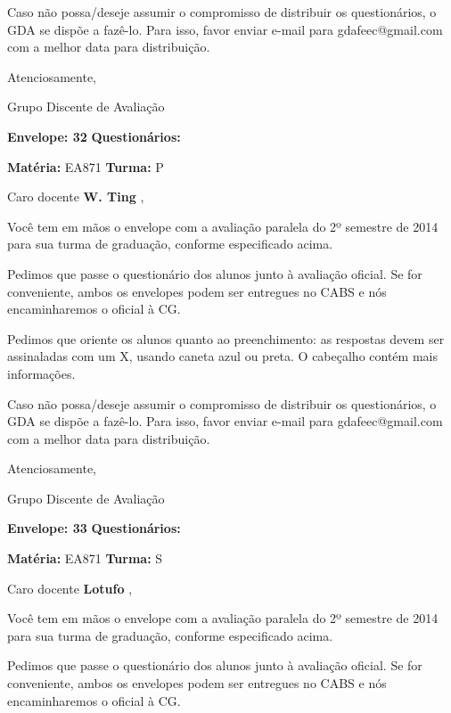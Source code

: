 \documentclass[a5paper]{letter}
\begin{document}
	Caso não possa/deseje assumir o compromisso de distribuir os questionários, o GDA se dispõe a fazê-lo. Para isso, favor enviar e-mail para gdafeec@gmail.com com a melhor data para distribuição.


Atenciosamente, 

Grupo Discente de Avaliação

\vspace{0.5cm}

{\bf Envelope: 32 }		\hfill	{\bf Questionários:} \hspace{2cm}

\newpage
\thispagestyle{empty}

\hfill {\bf Matéria:} EA871 {\bf Turma:} P

Caro docente {\bf W. Ting }, 

	Você tem em mãos o envelope com a avaliação paralela do 2º semestre de 2014 para sua turma de graduação, conforme especificado acima.

	Pedimos que passe o questionário dos alunos junto à avaliação oficial. Se for conveniente, ambos os envelopes podem ser entregues no CABS e nós encaminharemos o oficial à CG.

Pedimos que oriente os alunos quanto ao preenchimento: as respostas devem ser assinaladas com um X, usando caneta azul ou preta. O cabeçalho contém mais informações.

	Caso não possa/deseje assumir o compromisso de distribuir os questionários, o GDA se dispõe a fazê-lo. Para isso, favor enviar e-mail para gdafeec@gmail.com com a melhor data para distribuição.


Atenciosamente, 

Grupo Discente de Avaliação

\vspace{0.5cm}

{\bf Envelope: 33 }		\hfill	{\bf Questionários:} \hspace{2cm}

\newpage
\thispagestyle{empty}

\hfill {\bf Matéria:} EA871 {\bf Turma:} S

Caro docente {\bf Lotufo }, 

	Você tem em mãos o envelope com a avaliação paralela do 2º semestre de 2014 para sua turma de graduação, conforme especificado acima.

	Pedimos que passe o questionário dos alunos junto à avaliação oficial. Se for conveniente, ambos os envelopes podem ser entregues no CABS e nós encaminharemos o oficial à CG.
\end{document}
